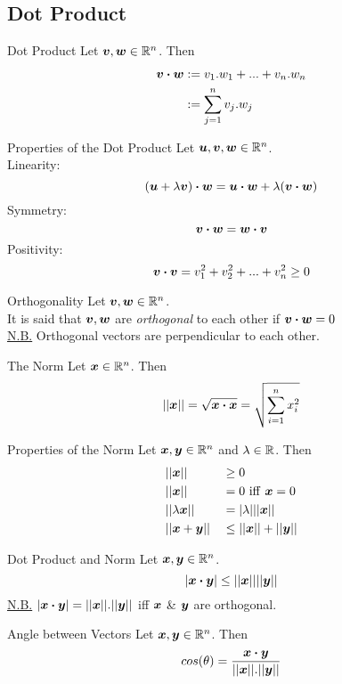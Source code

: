 \documentclass[11pt,a4paper]{article}
\begin{document}
\subsection{Dot Product}
%
\subtitle{Definition 2.04 - }{Dot Product}
Let $\boldsymbol{v}, \boldsymbol{w} \in \mathbb{R}^n$. Then \begin{alignat*}{1}
\boldsymbol{v} \boldsymbol{\cdot} \boldsymbol{w} &:= v_1.w_1 + ... + v_n.w_n \\
&:= \sum_{j=1}^n v_j.w_j
\end{alignat*}

\subtitle{Theorem 2.05 - }{Properties of the Dot Product}
Let $\boldsymbol{u}, \boldsymbol{v}, \boldsymbol{w} \in \mathbb{R}^n$.\\
Linearity:
$$(\boldsymbol{u} + \lambda\boldsymbol{v}) \boldsymbol{\cdot} \boldsymbol{w} = \boldsymbol{u} \boldsymbol{\cdot} \boldsymbol{w} + \lambda(\boldsymbol{v} \boldsymbol{\cdot} \boldsymbol{w})$$
Symmetry:
$$\boldsymbol{v} \boldsymbol{\cdot} \boldsymbol{w} = \boldsymbol{w} \boldsymbol{\cdot} \boldsymbol{v}$$
Positivity:
$$\boldsymbol{v} \boldsymbol{\cdot} \boldsymbol{v} = v_1^2 + v_2^2 + ... +v_n^2 \geq 0$$

\subtitle{Definition 2.06 - }{Orthogonality}
Let $\boldsymbol{v}, \boldsymbol{w} \in \mathbb{R}^n$. \\
It is said that $\boldsymbol{v}, \boldsymbol{w}$ are \textit{orthogonal} to each other if $\boldsymbol{v} \boldsymbol{\cdot} \boldsymbol{w} = 0$ \\
\underline{N.B.} Orthogonal vectors are perpendicular to each other. \\

\subtitle{Definition 2.07 - }{The Norm}
Let $\boldsymbol{x} \in \mathbb{R}^n$. Then
$$||\boldsymbol{x}|| = \sqrt{\boldsymbol{x} \boldsymbol{\cdot} \boldsymbol{x}} = \sqrt{\sum_{i=1}^n x_i^2}$$

\subtitle{Theorem 2.08 - }{Properties of the Norm}
Let $\boldsymbol{x}, \boldsymbol{y} \in \mathbb{R}^n$ and $\lambda \in \mathbb{R}$. Then
\begin{alignat*}{2}
  &||\boldsymbol{x}|| &&\geq 0 \\
  &||\boldsymbol{x}|| &&= 0 \mathrm{\ iff\ } \boldsymbol{x} = 0 \\
  &||\lambda\boldsymbol{x}|| &&= |\lambda| ||\boldsymbol{x}|| \\
  &||\boldsymbol{x} + \boldsymbol{y}|| &&\leq ||\boldsymbol{x}|| + ||\boldsymbol{y}||
\end{alignat*}

\subtitle{Theorem 2.09 - }{Dot Product and Norm}
Let $\boldsymbol{x}, \boldsymbol{y} \in \mathbb{R}^n$.
$$|\boldsymbol{x} \boldsymbol{\cdot} \boldsymbol{y}| \leq ||\boldsymbol{x}|| ||\boldsymbol{y}||$$
\underline{N.B.} $|\boldsymbol{x} \boldsymbol{\cdot} \boldsymbol{y}| = ||\boldsymbol{x}||.||\boldsymbol{y}||$ iff $\boldsymbol{x}$ \& $\boldsymbol{y}$ are orthogonal.\\

\subtitle{Theorem 2.10 - }{Angle between Vectors}
Let $\boldsymbol{x}, \boldsymbol{y} \in \mathbb{R}^n$. Then
$$cos(\theta) = \frac{\boldsymbol{x} \boldsymbol{\cdot} \boldsymbol{y}}{||\boldsymbol{x}||.||\boldsymbol{y}||}$$
\end{document}
